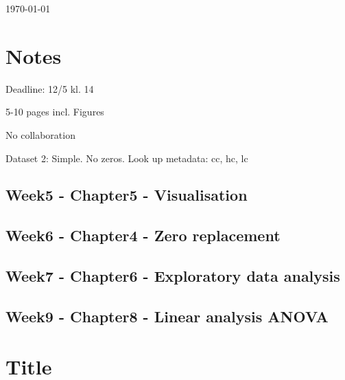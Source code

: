 \documentclass{article}
\begin{document}
\today
\tableofcontents


























\newpage{}

\section{Notes}

Deadline: 12/5 kl. 14

5-10 pages incl. Figures

No collaboration


Dataset 2: Simple. No zeros. Look up metadata: cc, hc, lc \newline


 
\subsection{Week5 - Chapter5 - Visualisation} 
\subsection{Week6 - Chapter4 - Zero replacement} 
\subsection{Week7 - Chapter6 - Exploratory data analysis } 
\subsection{Week9 - Chapter8 - Linear analysis ANOVA} 


\section{Title}
\end{document}
